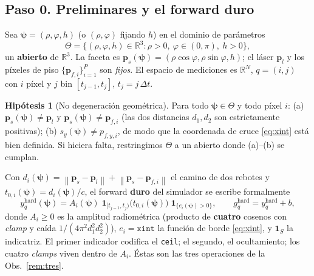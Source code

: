 \documentclass[11pt,a4paper]{article}
\theoremstyle{plain}
\theoremstyle{definition}
\newtheorem{assumption}{Hip\'otesis}
\newcommand{\vect}[1]{\boldsymbol{#1}}
\newcommand{\R}{\mathbb{R}}
\newcommand{\norm}[1]{\left\lVert #1 \right\rVert}
\begin{document}
\subsection*{Paso 0. Preliminares y el forward duro}
\label{sec:prelim}

Sea $\vect{\psi}=(\rho,\varphi,h)$ (o $(\rho,\varphi)$ fijando $h$) en el dominio
de par\'ametros
\begin{equation}
    \Theta=\bigl\{(\rho,\varphi,h)\in\R^3 : \rho>0,\ \varphi\in(0,\pi),\ h>0\bigr\},
    \label{eq:Theta}
\end{equation}
un \textbf{abierto} de $\R^3$. La faceta es
$\vect{p}_s(\vect{\psi})=(\rho\cos\varphi,\rho\sin\varphi,h)$; el l\'aser
$\vect{p}_l$ y los p\'ixeles de piso $\{\vect{p}_{f,i}\}_{i=1}^{P}$ son
\emph{fijos}. El espacio de mediciones es $\R^N$, $q=(i,j)$ con $i$ p\'ixel y $j$
bin $[t_{j-1},t_j]$, $t_j=j\,\Delta t$.

\begin{assumption}[No degeneraci\'on geom\'etrica]\label{as:geom}
Para todo $\vect{\psi}\in\Theta$ y todo p\'ixel $i$:
(a) $\vect{p}_s(\vect{\psi})\neq\vect{p}_l$ y
$\vect{p}_s(\vect{\psi})\neq\vect{p}_{f,i}$ (las dos distancias $d_1,d_2$ son
estrictamente positivas);
(b) $s_y(\vect{\psi})\neq p_{f,y,i}$, de modo que la coordenada de cruce
\eqref{eq:xint} est\'a bien definida. Si hiciera falta, restringimos $\Theta$ a
un abierto donde (a)--(b) se cumplan.
\end{assumption}

Con $d_i(\vect{\psi})=\norm{\vect{p}_s-\vect{p}_l}+\norm{\vect{p}_s-\vect{p}_{f,i}}$
el camino de dos rebotes y $t_{0,i}(\vect{\psi})=d_i(\vect{\psi})/c$, el forward
\textbf{duro} del simulador se escribe formalmente
\begin{equation}
    y^{\mathrm{hard}}_q(\vect{\psi})
    =A_i(\vect{\psi})\;
    \mathbf{1}_{[t_{j-1},t_j)}\!\bigl(t_{0,i}(\vect{\psi})\bigr)\;
    \mathbf{1}_{\{e_i(\vect{\psi})>0\}},
    \qquad g^{\mathrm{hard}}_q=y^{\mathrm{hard}}_q+b,
    \label{eq:hard}
\end{equation}
donde $A_i\ge0$ es la amplitud radiom\'etrica (producto de \textbf{cuatro}
cosenos con \emph{clamp} y ca\'ida $1/(4\pi^2 d_1^2 d_2^2)$), $e_i=\texttt{xint}$
la funci\'on de borde \eqref{eq:xint}, y $\mathbf 1_S$ la indicatriz. El primer
indicador codifica el \texttt{ceil}; el segundo, el ocultamiento; los cuatro
\emph{clamps} viven dentro de $A_i$. \'Estas son las tres operaciones de la
Obs.~\ref{rem:tres}.
\end{document}
